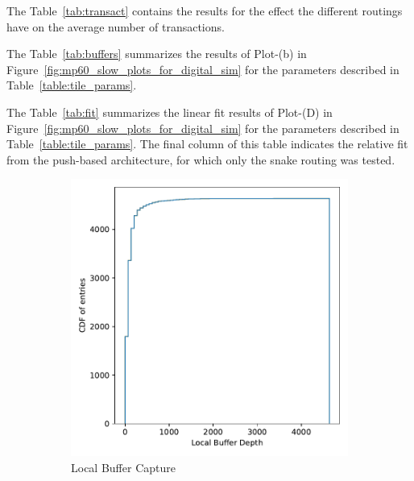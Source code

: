 The Table~\ref{tab:transact} contains the results for the effect the different routings have on the average number of transactions.

The Table~\ref{tab:buffers} summarizes the results of Plot-(b) in Figure~\ref{fig:mp60_slow_plots_for_digital_sim} for the parameters described in Table~\ref{table:tile_params}.

The Table~\ref{tab:fit} summarizes the linear fit results of Plot-(D) in Figure~\ref{fig:mp60_slow_plots_for_digital_sim} for the parameters described in Table~\ref{table:tile_params}.
The final column of this table indicates the relative fit from the push-based architecture, for which only the snake routing was tested.

\begin{figure}
  \centering
  \begin{subfigure}[b]{0.475\textwidth}
      \centering
      \includegraphics[width=\textwidth]{./images/mp60_16_slow_local_stack.pdf}
      \caption[]%
      {{\small Local Buffer Capture}}    
  \end{subfigure}
  \hfill
  \begin{subfigure}[b]{0.475\textwidth}  
      \centering 

\end{subfigure}
\end{figure}
